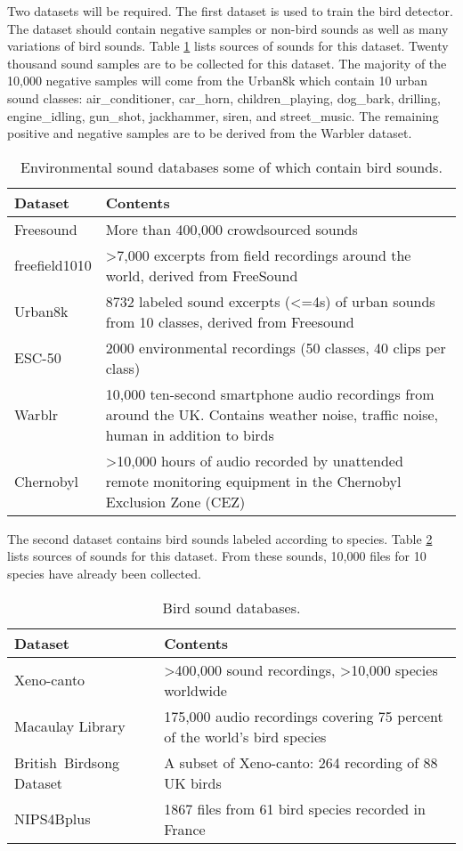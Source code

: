 Two datasets will be required. The first dataset is used to train the bird detector. The dataset should contain negative samples or non-bird sounds as well as many variations of bird sounds. Table \ref{serdb} lists sources of sounds for this dataset. Twenty thousand sound samples are to be collected for this dataset. The majority of the 10,000 negative samples will come from the Urban8k which contain 10 urban sound classes: air\_conditioner, car\_horn, children\_playing, dog\_bark, drilling, engine\_idling, gun\_shot, jackhammer, siren, and street\_music. The remaining positive and negative samples are to be derived from the Warbler dataset.

\begin{table}[h]
    \centering
    \small
    \caption{Environmental sound databases some of which contain bird sounds.}
    \label{serdb}
	\begin{tabular}{p{1in}p{4.5in}}
	\toprule
	\textbf{Dataset} & \textbf{Contents} \\
	\midrule
	Freesound & More than 400,000 crowdsourced sounds \\
	freefield1010 & >7,000 excerpts from field recordings around the world, derived from FreeSound  \\
	Urban8k & 8732 labeled sound excerpts (<=4s) of urban sounds from 10 classes, derived from Freesound \\
	ESC-50  & 2000 environmental recordings (50 classes, 40 clips per class) \\
    Warblr & 10,000 ten-second smartphone audio recordings from around the UK. Contains weather noise, traffic noise, human in addition to birds \\
    Chernobyl & >10,000 hours of audio recorded by unattended remote monitoring equipment in the Chernobyl Exclusion Zone (CEZ) \\
    \bottomrule
	\end{tabular}
\end{table}	

The second dataset contains  bird sounds labeled according to species. 
 Table \ref{birddb} lists sources of sounds for this dataset.
 From these sounds, 10,000 files for 10 species have already been collected.
 
\begin{table}[h]
    \centering
    \small
    \caption{Bird sound databases.}
    \label{birddb}
	\begin{tabular}{p{1.6in}p{3.9in}}
	\toprule
	\textbf{Dataset} & \textbf{Contents} \\
	\midrule
	Xeno-canto & >400,000 sound recordings,  >10,000 species worldwide \\
	Macaulay \mbox{Library} &  175,000 audio recordings covering 75 percent of the world's bird species \\
	British~\mbox{Birdsong} Dataset &  A subset of Xeno-canto: 264 recording of 88 UK birds\\
	NIPS4Bplus & 1867 files from 61 bird species recorded in France \\
	\bottomrule
	\end{tabular}
\end{table}	
	

